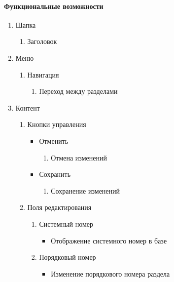 \paragraph{Функциональные возможности}
\begin{enumerate}
	\item Шапка
	\begin{enumerate}
		\item Заголовок
	\end{enumerate}

	\item Меню
	\begin{enumerate}
		\item Навигация
		\begin{enumerate}
			\item Переход между разделами
		\end{enumerate}
	\end{enumerate}

	\item Контент
	\begin{enumerate}
		\item Кнопки управления
		\begin{itemize}
			\item Отменить
			\begin{enumerate}
				\item Отмена изменений
			\end{enumerate}

			\item Сохранить
			\begin{enumerate}
				\item Сохранение изменений
			\end{enumerate}
		\end{itemize}

		\item Поля редактирования
		\begin{enumerate}
			\item Системный номер
			\begin{itemize}
				\item Отображение системного номер в базе
			\end{itemize}

			\item Порядковый номер
			\begin{itemize}
				\item Изменение порядкового номера раздела
			\end{itemize}


\end{enumerate}
\end{enumerate}
\end{enumerate}
